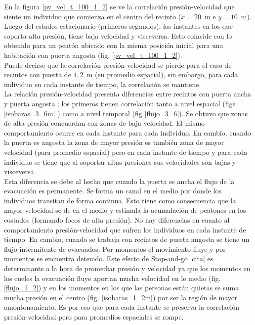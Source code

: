 En la figura \ref{pv_vel_t_100_1_2} se ve la correlación presión-velocidad que siente un individuo que comienza en el centro del recinto ($x=20$~m e $y=10$~m). Luego del estados estacionario (primeros segundos), los instantes en los que soporta alta presión, tiene baja velocidad y visceversa. Esto coincide con lo obtenido para un peatón ubicado con la misma posición inicial para una habitación con puerta angosta (fig. \ref{pv_vel_t_100_1_2}). \\
Puede decirse que la correlación presión-velocidad se pierde para el caso de recintos con puerta de $1,2$~m (en promedio espacial), sin embargo, para cada individuo en cada instante de tiempo, la correlación se mantiene. \\
La relación presión-velocidad presenta diferencias entre recintos con puerta ancha y puerta angosta ; los primeros tienen correlación tanto a nivel espacial (figs \ref{isobaras_3_6m} ) como a nivel temporal (fig \ref{flujo_3_6}). Se obtuvo que zonas de alta presión concuerdan con zonas de baja velocidad. El mismo comportamiento ocurre en cada instante para cada individuo. 
En cambio, cuando la puerta es angosta la zona de mayor presión es también zona de mayor velocidad (para promedio espacial) pero en cada instante de tiempo y para cada individuo se tiene que al soportar altas presiones sus velocidades son bajas y visceversa. \\
Esta diferencia se debe al hecho que cuando la puerta es ancha el flujo de la evacuación es permanente. Se forma un canal en el medio por donde los individuos transitan de forma continua. Esto tiene como consecuencia que la mayor velocidad se de en el medio y estimula la acumulación de peatones en los costados (formando focos de alta presión). No hay diferencias en cuanto al comportamiento presión-velocidad que sufren los individuos en cada instante de tiempo.
En cambio, cuando se trabaja con recintos de puerta angosta se tiene un flujo intermitente de evacuados. Por momentos el movimiento fluye y por momentos se encuentra detenido. Este efecto de Stop-and-go [cita] es determinante a la hora de promediar presión y velocidad ya que los momentos en los cueles la evacuación fluye aportan mucha velocidad en le medio (fig. \ref{flujo_1_2}) y en los momentos en los que las personas están quietas se suma mucha presión en el centro (fig. \ref{isobaras_1_2m}) por ser la región de mayor amontonamiento. Es por eso que para cada instante se preserva la correlación presión-velocidad pero para promedios espaciales se rompe.

